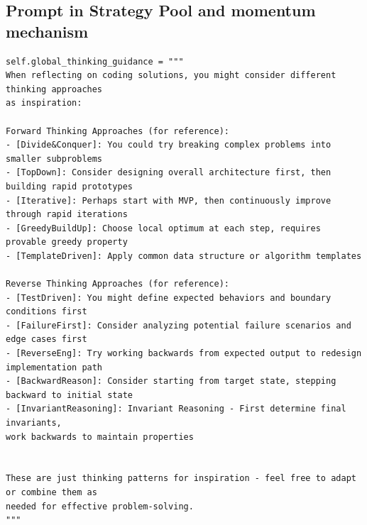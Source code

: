 \documentclass{article} %
\theoremstyle{definition}
\theoremstyle{remark}
\begin{document}
\subsection{Prompt in Strategy Pool and momentum mechanism}
\begin{tcolorbox}[notitle, sharp corners, breakable, colframe=ForestGreen, colback=white, 
       boxrule=3pt, boxsep=0.5pt, enhanced, 
       shadow={3pt}{-3pt}{0pt}{opacity=1,mygrey},
       title={Global Thinking Guidance},]\label{box:tag-generate}
       \scriptsize
       {\selectfont
\begin{lstlisting}
self.global_thinking_guidance = """
When reflecting on coding solutions, you might consider different thinking approaches 
as inspiration:

Forward Thinking Approaches (for reference):
- [Divide&Conquer]: You could try breaking complex problems into smaller subproblems
- [TopDown]: Consider designing overall architecture first, then building rapid prototypes  
- [Iterative]: Perhaps start with MVP, then continuously improve through rapid iterations
- [GreedyBuildUp]: Choose local optimum at each step, requires provable greedy property
- [TemplateDriven]: Apply common data structure or algorithm templates

Reverse Thinking Approaches (for reference):
- [TestDriven]: You might define expected behaviors and boundary conditions first
- [FailureFirst]: Consider analyzing potential failure scenarios and edge cases first
- [ReverseEng]: Try working backwards from expected output to redesign implementation path
- [BackwardReason]: Consider starting from target state, stepping backward to initial state
- [InvariantReasoning]: Invariant Reasoning - First determine final invariants, 
work backwards to maintain properties


These are just thinking patterns for inspiration - feel free to adapt or combine them as 
needed for effective problem-solving.
"""
\end{lstlisting}
}
\end{tcolorbox}
\end{document}
